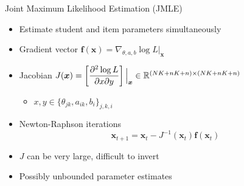 \documentclass{beamer}
\def \R{\ensuremath \mathbb{R}}
\newcommand{\vect}[1]{\boldsymbol{#1}}
\theoremstyle{definition}
\begin{document}
\begin{frame}{Joint Maximum Likelihood Estimation (JMLE)}
\begin{itemize}
  \item Estimate student and item parameters simultaneously
  \item Gradient vector $\vect f(\vect x) = \nabla_{\theta,a,b} \log L\big|_{\vect x}$ 
  \item Jacobian $J(\vect x) = \left[\displaystyle \frac{\partial^2 \log L}{\partial x \partial y} \right] \Big|_{\vect x} \in \R^{(NK+nK + n) \times (NK + nK + n)}$ 
    \begin{itemize}
      \item $x,y \in \{\theta_{jk}, a_{ik}, b_i\}_{j,k,i}$
    \end{itemize}
  \item Newton-Raphson iterations
    \[\vect x_{t+1} = \vect x_t - J^{-1}(\vect x_t) \vect f(\vect x_t)\]
  \item<2-> $J$ can be very large, difficult to invert
  \item<2-> Possibly unbounded parameter estimates
\end{itemize}
\end{frame}
\end{document}
